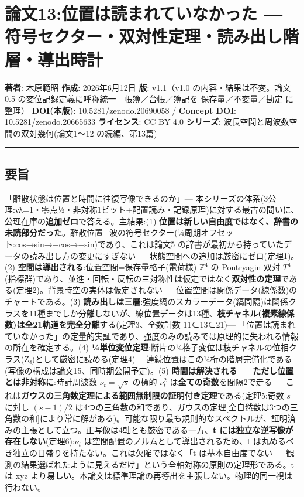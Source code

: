 \documentclass[
]{ltjsarticle}
\author{}
\date{}
\begin{document}
\section{論文13:位置は読まれていなかった ---
符号セクター・双対性定理・読み出し階層・導出時計}\label{ux8ad6ux658713ux4f4dux7f6eux306fux8aadux307eux308cux3066ux3044ux306aux304bux3063ux305f-ux7b26ux53f7ux30bbux30afux30bfux30fcux53ccux5bfeux6027ux5b9aux7406ux8aadux307fux51faux3057ux968eux5c64ux5c0eux51faux6642ux8a08}

\textbf{著者}: 木原範昭 \textbf{作成}: 2026年6月12日 \textbf{版}:
v1.1（v1.0 の内容・結果は不変。論文0.5
の変位記録定義に呼称統一＝帳簿／台帳／簿記を 保存量／不変量／勘定
に整理） \textbf{DOI(本版)}: 10.5281/zenodo.20690058 / \textbf{Concept
DOI}: 10.5281/zenodo.20665633 \textbf{ライセンス}: CC BY 4.0
\textbf{シリーズ}: 波長空間と周波数空間の双対幾何(論文1〜12
の続編、第13篇)

\begin{center}\rule{0.5\linewidth}{0.5pt}\end{center}

\subsection{要旨}\label{ux8981ux65e8}

「離散状態は位置と時間に往復写像できるのか」---
本シリーズの体系(3公理:νλ=1・零点½・非対称1ビット+配置読み・記録原理)に対する最古の問いに、公理在庫の\textbf{追加ゼロ}で答える。主結果:(1)
\textbf{位置は新しい自由度ではなく、辞書の未読部分だった}。離散位置=波の符号セクター(¼周期オフセット:cos→sin→−cos→−sin)であり、これは論文5
の辞書が最初から持っていたデータの読み出し方の変更にすぎない ---
状態空間への追加は厳密にゼロ(定理1)。(2)
\textbf{空間は導出される}:位置空間=保存量格子(電荷様) \(\mathbb{Z}^4\)
の Pontryagin 双対
\(T^4\)(指標群)であり、並進・回転・反転の三対称性は仮定ではなく\textbf{双対性の定理}である(定理2)。背景時空の実体は仮定されない
--- 位置空間は関係データ(線係数)のチャートである。(3)
\textbf{読み出しは三層}:強度縞のスカラーデータ(縞間隔)は関係クラスを11種までしか分離しないが、線位置データは13種、\textbf{枝チャネル(複素線係数)は全21軌道を完全分離}する(定理3、全数計数
11⊂13⊂21)---
「位置は読まれていなかった」の定量的実証であり、強度のみの読みでは原理的に失われる情報の所在を確定する。(4)
\textbf{¼単位変位定理}:断片の¼格子変位は枝チャネルの位相クラス(Z₄)として厳密に読める(定理4)---
連続位置はこの¼桁の階層完備化である(写像の構成は論文15、同時期公開予定)。(5)
\textbf{時間は解決される --- ただし位置とは非対称に}:時計周波数
\(\nu_t=\sqrt{s}\) の標的 \(\nu_t^2\) は\textbf{全ての奇数}を間隔2で走る
---
これは\textbf{ガウスの三角数定理による範囲無制限の証明付き定理}である(定理5:奇数
\(s\) に対し \((s-1)/2\)
は4つの三角数の和であり、ガウスの定理{[}全自然数は3つの三角数の和{]}により常に解がある)。可能な限り最も規則的なスペクトルが、証明済みの主張として立つ。正写像は4軸とも厳密である一方、\textbf{t
には独立な逆写像が存在しない}(定理6):\(\nu_t\)
は空間配置のノルムとして導出されるため、t
は丸めるべき独立の目盛りを持たない。これは欠陥ではなく「t
は基本自由度でない ---
観測の結果選ばれたように見えるだけ」という全軸対称の原則の定理形である。t
は xyz
より\textbf{易しい}。本論文は標準理論の再導出を主張しない。物理的同一視は行わない。
\end{document}

